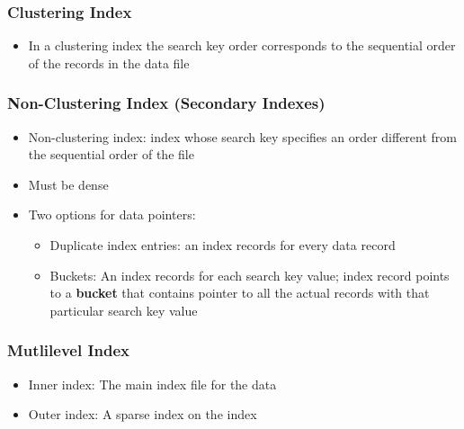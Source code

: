 \subsubsection{Clustering Index}
\begin{itemize}[label=\(\rhd\)]
    \item In a clustering index the search key order corresponds to the sequential order of the records in the data file
\end{itemize}
\subsubsection{Non-Clustering Index (Secondary Indexes)}
\begin{itemize}[label=\(\rhd\)]
    \item Non-clustering index: index whose search key specifies an order different from the sequential order of the file
    \item Must be dense
    \item Two options for data pointers:
    \begin{itemize}[label=\(\rhd\)]
        \item Duplicate index entries: an index records for every data record
        \item Buckets: An index records for each search key value; index record points to a \textbf{bucket} that contains pointer to all the actual records with that particular search key value
    \end{itemize}
\end{itemize}

\subsubsection{Mutlilevel Index}
\begin{itemize}[label=\(\rhd\)]
    \item Inner index: The main index file for the data
    \item Outer index: A sparse index on the index
\end{itemize}


